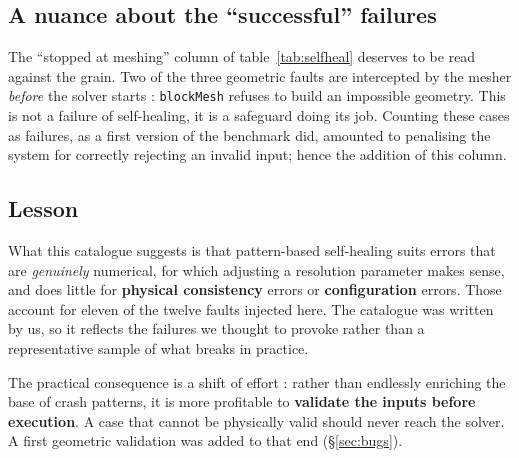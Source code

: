 \subsection{A nuance about the ``successful'' failures}

The ``stopped at meshing'' column of table~\ref{tab:selfheal} deserves to be
read against the grain. Two of the three geometric faults are intercepted by the
mesher \emph{before} the solver starts : \texttt{blockMesh} refuses to build an
impossible geometry. This is not a failure of self-healing, it is a safeguard
doing its job. Counting these cases as failures, as a first version of the
benchmark did, amounted to penalising the system for correctly rejecting an
invalid input; hence the addition of this column.

\subsection{Lesson}

What this catalogue suggests is that pattern-based self-healing suits errors
that are \emph{genuinely} numerical, for which adjusting a resolution parameter
makes sense, and does little for \textbf{physical consistency} errors or
\textbf{configuration} errors. Those account for eleven of the twelve faults
injected here. The catalogue was written by us, so it reflects the failures we
thought to provoke rather than a representative sample of what breaks in
practice.

The practical consequence is a shift of effort : rather than endlessly enriching
the base of crash patterns, it is more profitable to \textbf{validate the inputs
before execution}. A case that cannot be physically valid should never reach the
solver. A first geometric validation was added to that end (§\ref{sec:bugs}).
